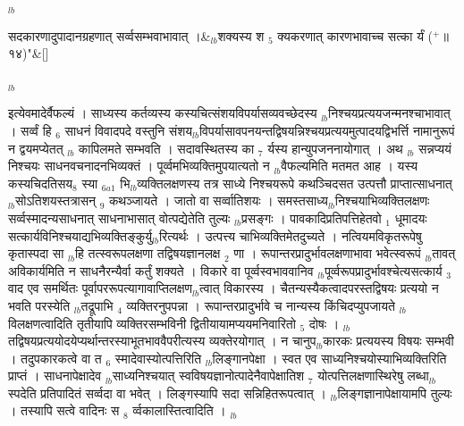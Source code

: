 \documentclass[article,12pt,a4paper]{memoir}%
\newcommand{\add}[1]{($^{+}$#1)}
\newcounter{parCount}
\begin{document}
	{}
	\pend%
      {\tiny $_{lb}$}
	  \bigskip
	  \begingroup
	
	    
	    \stanza[\smallbreak]
	  सदकारणादुपादानग्रहणात् सर्व्वसम्भवाभावात् ।&{\tiny $_{lb}$}शक्यस्य श {\tiny $_{5}$} क्यकरणात् कारणभावाच्च सत्का र्यं \add{॥ १४}{\normalfontlatin\large\qquad{}"}\&[\smallbreak]
	  
	  
	  
	  \endgroup
	{\tiny $_{lb}$}

	  
	  \pstart \leavevmode%
	इत्येवमादेर्वैफल्यं । साध्यस्य कर्तव्यस्य कस्यचित्संशयविपर्यासव्यवच्छेदस्य {\tiny $_{lb}$}निश्चयप्रत्ययजन्मनश्चाभावात् । सर्व्वं हि {\tiny $_{6}$} साधनं विवादपदे वस्तुनि संशय{\tiny $_{lb}$}विपर्यासावपनयन्तद्विषयन्निश्चयप्रत्ययमुत्पादयद्विभर्त्ति नामानुरूपं न द्वयमप्येतत् {\tiny $_{lb}$} {\color{DodgerBlue3}कापिलमते} सम्भवति । सदावस्थितस्य का {\tiny $_{7}$} र्यस्य हान्युपजननायोगात् । अथ {\tiny $_{lb}$} \leavevmode{} सन्नप्ययं निश्चयः साधनवचनादनभिव्यक्तं । पूर्व्वमभिव्यक्तिमुपयात्यतो न {\tiny $_{lb}$}वैफल्यमिति मतमत आह । {\color{DodgerBlue3}यस्य कस्यचिदति}सय{\tiny $_{8}$} स्या {\tiny $_{6a1}$} भि{\tiny $_{lb}$}व्यक्तिलक्षणस्य तत्र साध्ये निश्चयरूपे कथञ्चिदसत उत्पत्तौ प्राप्तात्साधनात् {\tiny $_{lb}$}सोऽतिशयस्तत्रासन् {\tiny $_{9}$} \leavevmode{} कथञ्जायते । जातो वा सर्व्वातिशयः । समस्तसाध्य{\tiny $_{lb}$}निश्चयाभिव्यक्तिलक्षणः सर्व्वस्मादन्यसाधनात् साधनाभासात् वोत्पद्येतेति तुल्यः {\tiny $_{lb}$}प्रसङ्गः । पावकादिप्रतिपत्तिहेतवो {\tiny $_{1}$} धूमादयः सत्कार्यविनिश्चयाद्यभिव्यक्तिङ्कुर्यु{\tiny $_{lb}$}रित्यर्थः । उत्पत्त्य चाभिव्यक्तिमेतदुच्यते । नत्वियमविकृतरूपेषु कृतास्पदा सा {\tiny $_{lb}$}हि तत्स्वरूपलक्षणा तद्विषयज्ञानलक्ष {\tiny $_{2}$} णा । रूपान्तरप्रादुर्भावलक्षणाभावा भवेत्स्वरूपं {\tiny $_{lb}$}तावत् अविकार्यमिति न साधनैरन्यैर्वा कर्तुं शक्यते । विकारे वा पूर्व्वस्वभाववानिव {\tiny $_{lb}$}पूर्व्वरूपप्रादुर्भावश्चेत्यसत्कार्य {\tiny $_{3}$} वाद एव समर्थितः पूर्वापररूपत्यागावाप्तिलक्षण{\tiny $_{lb}$}त्वात् विकारस्य । चैतन्यस्यैकत्वादपरस्तद्विषयः प्रत्ययो न भवति परस्येति {\tiny $_{lb}$}तद्रूपाभि {\tiny $_{4}$} व्यक्तिरनुपपन्ना । रूपान्तरप्रादुर्भावे च नान्यस्य किंचिदप्युपजायते {\tiny $_{lb}$}विलक्षणत्वादिति तृतीयापि व्यक्तिरसम्भविनी द्वितीयायामप्ययमनिवारितो {\tiny $_{5}$} दोषः । {\tiny $_{lb}$}तद्विषयप्रत्ययोदयेप्यर्थान्तरस्याभूतभाववैपरीत्यस्य व्यक्तेरयोगात् । न चानुप{\tiny $_{lb}$}कारकः प्रत्ययस्य विषयः सम्भवी । तदुपकारकत्वे वा त {\tiny $_{6}$} स्मादेवास्योत्पत्तिरिति {\tiny $_{lb}$}लिङ्गानपेक्षा । स्वत एव साध्यनिश्चयोस्याभिव्यक्तिरिति प्राप्तं । साधनापेक्षादेव {\tiny $_{lb}$}साध्यनिश्चयात् स्वविषयज्ञानोत्पादेनैवापेक्षातिश {\tiny $_{7}$} योत्पत्तिलक्षणास्थिरेषु लब्धा{\tiny $_{lb}$}स्पदेति प्रतिपादितं सर्व्वदा वा भवेत् । लिङ्गस्यापि सदा सन्निहितरूपत्वात् । {\tiny $_{lb}$}लिङ्गज्ञानापेक्षायामपि तुल्यः । तस्यापि सत्वे वादिनः स {\tiny $_{8}$} र्व्वकालास्तित्वादिति ।
	{}
	\pend%
      {\tiny $_{lb}$}
\end{document}

